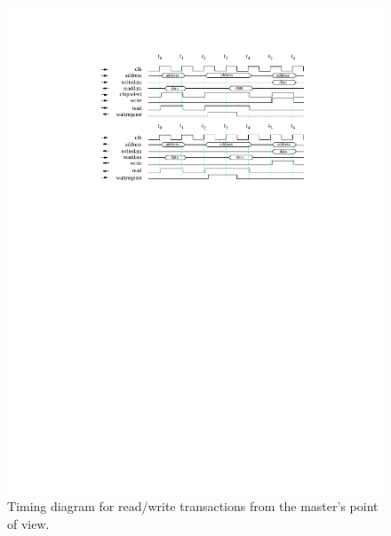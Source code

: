 \documentclass[11pt, twoside, pdftex]{article}
\begin{document}
\begin{figure}[h!]
   \begin{center}
        \includegraphics[scale=1.1]{figures/figure6.pdf}
   \end{center}
   \caption{Timing diagram for read/write transactions from the master's point of view.}
	\label{fig:6}
\end{figure}
\end{document}

